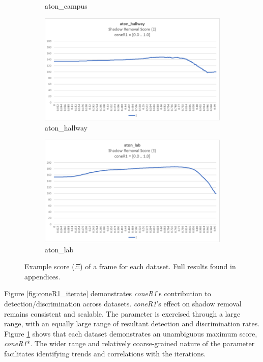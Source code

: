 \begin{figure}
\begin{subfigure}{.45\linewidth}
  \caption{aton\_campus}
\end{subfigure}
\hfill
\begin{subfigure}{.45\linewidth}
  \includegraphics[width=1\linewidth]{figures/hallway_coneR1_score.jpg}
  \caption{aton\_hallway}
\end{subfigure}
\hfill
\begin{subfigure}{.45\linewidth}
  \includegraphics[width=1\linewidth]{figures/lab_coneR1_score.jpg}
  \caption{aton\_lab}
\end{subfigure}

\caption{Example score ($\Xi$) of a frame for each dataset. Full results found in appendices.}
\label{fig:coneR1_iterate_score}
\end{figure}

Figure \ref{fig:coneR1_iterate} demonstrates \textit{coneR1}'s contribution to detection/discrimination across datasets. \textit{coneR1}'s effect on shadow removal remains consistent and scalable. The parameter is exercised through a large range, with an equally large range of resultant detection and discrimination rates. Figure \ref{fig:coneR1_iterate_score} shows that each dataset demonstrates an unambiguous maximum score, \textit{coneR1}*. The wider range and relatively coarse-grained nature of the parameter facilitates identifying trends and correlations with the iterations.


